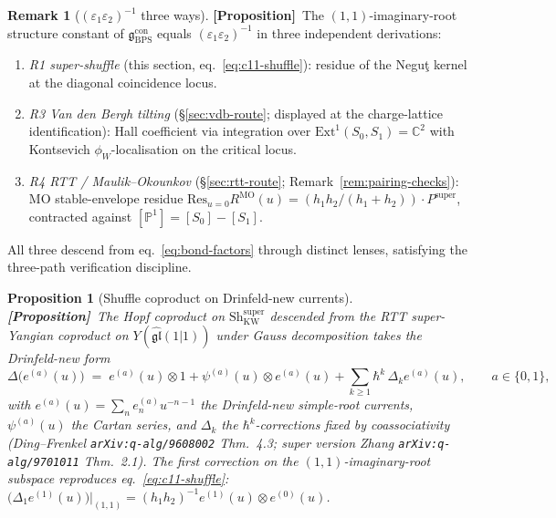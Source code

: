 \documentclass[11pt]{amsart}
\newtheorem{proposition}[theorem]{Proposition}
\theoremstyle{definition}
\newtheorem{remark}[theorem]{Remark}
\providecommand{\Ext}{\mathrm{Ext}}
\providecommand{\bC}{\mathbb{C}}
\providecommand{\bP}{\mathbb{P}}
\providecommand{\fgl}{\mathfrak{gl}}
\providecommand{\fg}{\mathfrak{g}}
\providecommand{\ClaimStatusProposition}{\textbf{\textsf{[Proposition]}}}
\begin{document}
\begin{remark}[$(\varepsilon_1 \varepsilon_2)^{-1}$ three ways]
\label{rem:three-way-check}
\ClaimStatusProposition\
The $(1,1)$-imaginary-root structure constant of
$\fg_{\mathrm{BPS}}^{\mathrm{con}}$ equals
$(\varepsilon_1 \varepsilon_2)^{-1}$ in three independent derivations:
\begin{enumerate}[leftmargin=2em, label=\emph{(\alph*)}]
\item \emph{R1 super-shuffle} (this section, eq.~\eqref{eq:c11-shuffle}):
  residue of the Negu\c{t} kernel at the diagonal coincidence locus.
\item \emph{R3 Van den Bergh tilting} (§\ref{sec:vdb-route}; displayed
  at the charge-lattice identification): Hall coefficient via
  integration over $\Ext^1(S_0, S_1) = \bC^2$ with Kontsevich
  $\phi_W$-localisation on the critical locus.
\item \emph{R4 RTT / Maulik--Okounkov} (§\ref{sec:rtt-route};
  Remark~\ref{rem:pairing-checks}): MO stable-envelope residue
  $\mathrm{Res}_{u = 0} R^{\mathrm{MO}}(u) =
  (h_1 h_2 / (h_1 + h_2)) \cdot P^{\mathrm{super}}$, contracted
  against $[\bP^1] = [S_0] - [S_1]$.
\end{enumerate}
All three descend from eq.~\eqref{eq:bond-factors} through distinct
lenses, satisfying the three-path verification discipline.
\end{remark}

\begin{proposition}[Shuffle coproduct on Drinfeld-new currents]
\label{prop:shuffle-coproduct}
\ClaimStatusProposition\
The Hopf coproduct on $\mathrm{Sh}^{\mathrm{super}}_{\mathrm{KW}}$
descended from the RTT super-Yangian coproduct on
$Y(\widehat{\fgl}(1|1))$ under Gauss decomposition takes the
Drinfeld-new form
\begin{equation}\label{eq:shuffle-coproduct}
  \Delta\bigl(e^{(a)}(u)\bigr)
  \;=\;
  e^{(a)}(u) \otimes 1
  + \psi^{(a)}(u) \otimes e^{(a)}(u)
  + \sum_{k \geq 1} \hbar^k \,\Delta_k e^{(a)}(u),
  \qquad a \in \{0, 1\},
\end{equation}
with $e^{(a)}(u) = \sum_n e^{(a)}_n u^{-n-1}$ the Drinfeld-new
simple-root currents, $\psi^{(a)}(u)$ the Cartan series, and
$\Delta_k$ the $\hbar^k$-corrections fixed by coassociativity
(Ding--Frenkel \texttt{arXiv:q-alg/9608002} Thm.~4.3; super version
Zhang \texttt{arXiv:q-alg/9701011} Thm.~2.1). The first correction on
the $(1,1)$-imaginary-root subspace reproduces eq.~\eqref{eq:c11-shuffle}:
$\bigl(\Delta_1 e^{(1)}(u)\bigr)|_{(1,1)} = (h_1 h_2)^{-1}
e^{(1)}(u) \otimes e^{(0)}(u)$.
\end{proposition}
\end{document}
